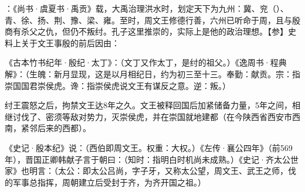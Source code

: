 {\item {}：《尚书·虞夏书·禹贡》载，大禹治理洪水时，划定天下为九州：冀、兖（）、青、徐、扬、荆、豫、梁、雍。至时，周文王修德行善，六州已听命于周，且与殷商有杀父之仇，但仍不叛纣。孔子这里推崇的，实际上是他的政治理想。【参】史料上关于文王事殷的前后因由：
\begin{lyenumerate}
\item 《古本竹书纪年·殷纪·太丁》：（文丁又作太丁，是纣的祖父。）《逸周书·程典解》：（生魄：新月显现，这是以月相纪日，约为初三至十三。奉勤：献贡。宗：指崇国国君崇侯虎。谗：指崇侯虎说文王有谋反之意。逆：叛。）

\item 纣王震怒之后，拘禁文王达8年之久。文王被释回国后加紧储备力量，5年之间，相继讨伐了、密须等敌对势力，灭崇侯虎，并在崇国就地建都（在今陕西省西安市西南，紧邻后来的西都）。

\item 《史记·殷本纪》说：（西伯即周文王。权重：大权。）《左传·襄公四年》（前569年），晋国正卿韩献子言于朝曰：（知时：指明白时机尚未成熟。）《史记·齐太公世家》也明言：（太公：即太公吕尚，字子牙，又称太公望，周文王、武王之师，伐的军事总指挥，周朝建立后受封于齐，为齐开国之祖。）
\end{lyenumerate}
}
{}


